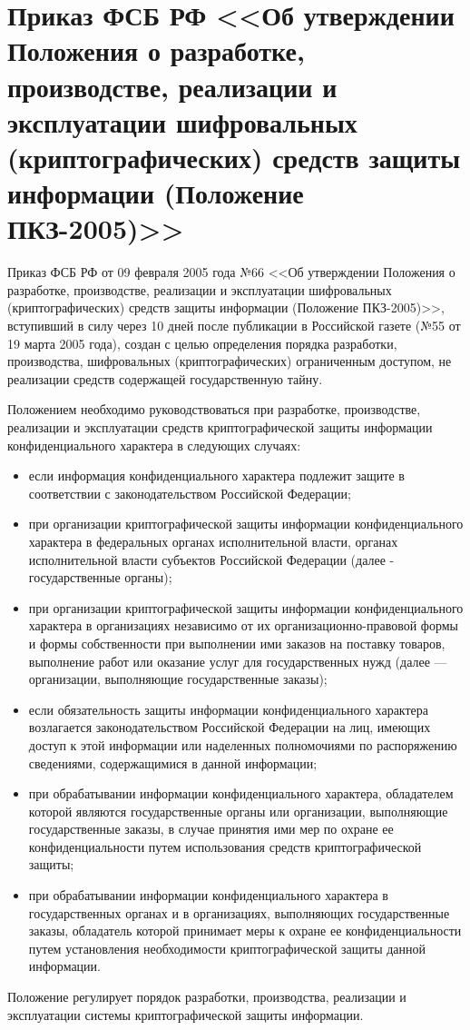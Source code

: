 \section{Приказ ФСБ РФ <<Об утверждении Положения о разработке, производстве, реализации и эксплуатации шифровальных (криптографических) средств защиты информации (Положение ПКЗ-2005)>>} \label{rights_fsb_66}

Приказ ФСБ РФ от 09 февраля 2005 года №66 <<Об утверждении Положения о разработке, производстве, реализации и эксплуатации шифровальных (криптографических) средств защиты информации (Положение ПКЗ-2005)>>, вступивший в силу через 10 дней после публикации в Российской газете (№55 от 19 марта 2005 года), создан с целью определения
порядка разработки, производства, шифровальных (криптографических) ограниченным доступом, не реализации средств содержащей государственную тайну.

\vspace{\baselineskip}
Положением необходимо руководствоваться при разработке, производстве, реализации и эксплуатации средств криптографической защиты информации конфиденциального характера в следующих случаях:
\begin{itemize}
	\item если информация конфиденциального характера подлежит защите в соответствии с законодательством Российской Федерации;
	\item при организации криптографической защиты информации конфиденциального характера в федеральных органах исполнительной власти, органах исполнительной власти субъектов Российской Федерации (далее - государственные органы);
	\item при организации криптографической защиты информации конфиденциального характера в организациях независимо от их организационно-правовой формы и формы собственности при выполнении ими заказов на поставку товаров, выполнение работ или оказание услуг для государственных нужд (далее --- организации, выполняющие государственные заказы);
	\item если обязательность защиты информации конфиденциального характера возлагается законодательством Российской Федерации на лиц, имеющих доступ к этой информации или наделенных полномочиями по распоряжению сведениями, содержащимися в данной информации;
	\item при обрабатывании информации конфиденциального характера, обладателем которой являются государственные органы или организации, выполняющие государственные заказы, в случае принятия ими мер по охране ее конфиденциальности путем использования средств криптографической защиты;
	\item при обрабатывании информации конфиденциального характера в государственных органах и в организациях, выполняющих государственные заказы, обладатель которой принимает меры к охране ее конфиденциальности путем установления необходимости криптографической защиты данной информации.
\end{itemize}

Положение регулирует порядок разработки, производства, реализации и эксплуатации системы криптографической защиты информации.
